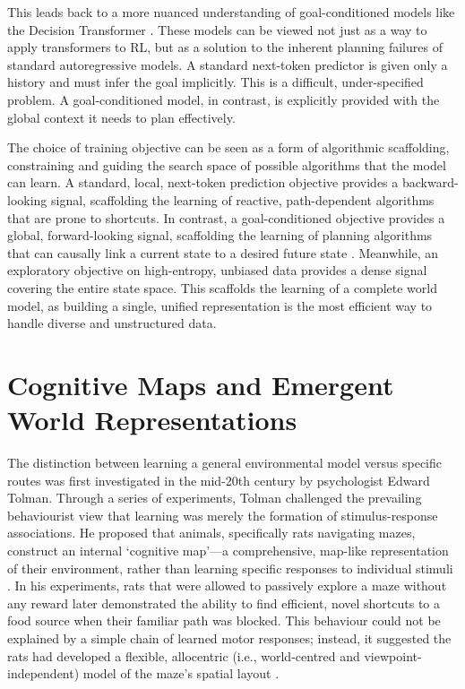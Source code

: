 This leads back to a more nuanced understanding of goal-conditioned models like the Decision Transformer \cite{DT}. These models can be viewed not just as a way to apply transformers to RL, but as a solution to the inherent planning failures of standard autoregressive models. A standard next-token predictor is given only a history and must infer the goal implicitly. This is a difficult, under-specified problem. A goal-conditioned model, in contrast, is explicitly provided with the global context it needs to plan effectively.

The choice of training objective can be seen as a form of algorithmic scaffolding, constraining and guiding the search space of possible algorithms that the model can learn. A standard, local, next-token prediction objective provides a backward-looking signal, scaffolding the learning of reactive, path-dependent algorithms that are prone to shortcuts. In contrast, a goal-conditioned objective provides a global, forward-looking signal, scaffolding the learning of planning algorithms that can causally link a current state to a desired future state \cite{nasiriany2019planninggoalconditionedpolicies}. Meanwhile, an exploratory objective on high-entropy, unbiased data provides a dense signal covering the entire state space. This scaffolds the learning of a complete world model, as building a single, unified representation is the most efficient way to handle diverse and unstructured data.

\section{Cognitive Maps and Emergent World Representations}

The distinction between learning a general environmental model versus specific routes was first investigated in the mid-20th century by psychologist Edward Tolman. Through a series of experiments, Tolman challenged the prevailing behaviourist view that learning was merely the formation of stimulus-response associations. He proposed that animals, specifically rats navigating mazes, construct an internal `cognitive map'—a comprehensive, map-like representation of their environment, rather than learning specific responses to individual stimuli \citep{tolman1948cognitive}. In his experiments, rats that were allowed to passively explore a maze without any reward later demonstrated the ability to find efficient, novel shortcuts to a food source when their familiar path was blocked. This behaviour could not be explained by a simple chain of learned motor responses; instead, it suggested the rats had developed a flexible, allocentric (i.e., world-centred and viewpoint-independent) model of the maze's spatial layout \citep{tolman1930maze}.


